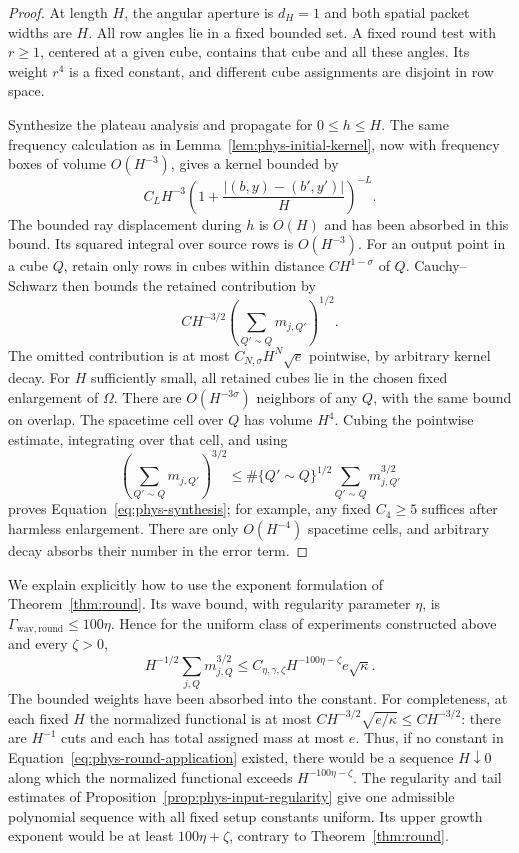 \begin{proof}
At length $H$, the angular aperture is $d_H=1$ and both spatial
packet widths are $H$.  All row angles lie in a fixed bounded set.
A fixed round test with $r\ge1$, centered at a given cube, contains
that cube and all these angles.  Its weight $r^4$ is a fixed
constant, and different cube assignments are disjoint in row
space.

Synthesize the plateau analysis and propagate for $0\le h\le H$.
The same frequency calculation as in
Lemma~\ref{lem:phys-initial-kernel}, now with frequency boxes of
volume $O(H^{-3})$, gives a kernel bounded by
\[
 C_L H^{-3}\left(1+
       \frac{|(b,y)-(b',y')|}{H}\right)^{-L}.
\]
The bounded ray displacement during $h$ is $O(H)$ and has been
absorbed in this bound.  Its squared integral over source rows is
$O(H^{-3})$.  For an output point in a cube $Q$, retain only rows
in cubes within distance $C H^{1-\sigma}$ of $Q$.  Cauchy--Schwarz
then bounds the retained contribution by
\[
 C H^{-3/2}
 \left(\sum_{Q'\sim Q}m_{j,Q'}\right)^{1/2}.
\]
The omitted contribution is at most $C_{N,\sigma}H^N\sqrt e$
pointwise, by arbitrary kernel decay.  For $H$ sufficiently small,
all retained cubes lie in the chosen fixed enlargement of $\Omega$.
There are $O(H^{-3\sigma})$ neighbors of any $Q$, with the same
bound on overlap.  The spacetime cell over $Q$ has volume $H^4$.
Cubing the pointwise estimate, integrating over that cell, and
using
\[
 \left(\sum_{Q'\sim Q}m_{j,Q'}\right)^{3/2}
 \le \#\{Q'\sim Q\}^{1/2}
              \sum_{Q'\sim Q}m_{j,Q'}^{3/2}
\]
proves Equation~\eqref{eq:phys-synthesis}; for example, any fixed
$C_4\ge5$ suffices after harmless enlargement.  There are only
$O(H^{-4})$ spacetime cells, and arbitrary decay absorbs their
number in the error term.
\end{proof}

We explain explicitly how to use the exponent formulation of
Theorem~\ref{thm:round}.  Its wave bound, with regularity parameter
$\eta$, is $\Gamma_{\mathrm{wav},\mathrm{round}}\le100\eta$.  Hence for the
uniform class of experiments constructed above and every $\zeta>0$,
\begin{equation}
 H^{-1/2}\sum_{j,Q}m_{j,Q}^{3/2}
 \le C_{\eta,\gamma,\zeta}H^{-100\eta-\zeta}e\sqrt\kappa.
 \label{eq:phys-round-application}
\end{equation}
The bounded weights have been absorbed into the constant.
For completeness, at each fixed $H$ the normalized functional is
at most $C H^{-3/2}\sqrt{e/\kappa}\le C H^{-3/2}$: there are
$H^{-1}$ cuts and each has total assigned mass at most $e$.
Thus, if no constant in Equation~\eqref{eq:phys-round-application}
existed, there would be a sequence $H\downarrow0$ along
which the normalized functional exceeds
$H^{-100\eta-\zeta}$.  The regularity and tail estimates of
Proposition~\ref{prop:phys-input-regularity} give one
admissible polynomial sequence with all fixed setup constants
uniform.  Its upper growth exponent would be at least
$100\eta+\zeta$, contrary to Theorem~\ref{thm:round}.

